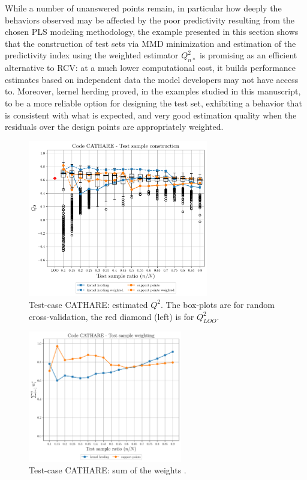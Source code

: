While a number of unanswered points remain, in particular how deeply the behaviors observed may be affected by the poor predictivity resulting from the chosen PLS modeling methodology, the example presented in this section shows that the construction of test sets via MMD minimization and estimation of the predictivity index using the weighted estimator $Q_{n*}^2$ is promising as an efficient alternative to RCV: at a much lower computational cost, it builds performance estimates based on independent data the model developers may not have access to. 
Moreover, kernel herding proved, in the examples studied in this manuscript, to be a more reliable option for designing the test set, exhibiting a behavior that is consistent with what is expected, and very good estimation quality when the residuals over the design points are appropriately weighted.

\begin{figure}
  \centering
  \includegraphics[width=0.7\textwidth]{./part2/figures/SIS/cathareC2.pdf}
  \caption{Test-case CATHARE: estimated $Q^2$. The box-plots are for random cross-validation, the red diamond (left) is for $Q^2_{LOO}$.}
  \label{fig:cathareC2_benchmark}
\end{figure}

\begin{figure}
  \centering
  \includegraphics[width=0.6\textwidth]{./part2/figures/SIS/cathareC2_weights.pdf}
  \caption{Test-case CATHARE: sum of the weights .}
  \label{fig:catharec2_weights}
\end{figure}





